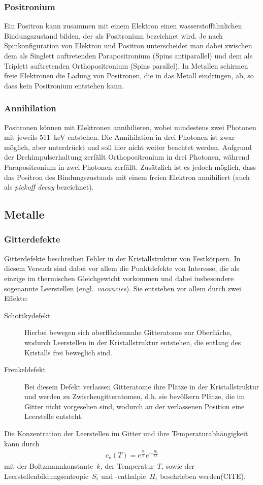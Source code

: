 \documentclass[11pt, a4paper]{article}
\numberwithin{equation}{section}
\newcommand{\korr}[1]{{\color{red}(#1)}}
\begin{document}
\subsubsection{Positronium}

Ein Positron kann zusammen mit einem Elektron einen wasserstoffähnlichen Bindungszustand bilden, der als Positronium bezeichnet wird.
Je nach Spinkonfiguration von Elektron und Positron unterscheidet man dabei zwischen dem als Singlett auftretenden Parapositronium (Spins antiparallel) und dem als Triplett auftretenden Orthopositronium (Spins parallel).
In Metallen schirmen freie Elektronen die Ladung von Positronen, die in das Metall eindringen, ab, so dass kein Positronium entstehen kann.

\subsubsection{Annihilation}

Positronen können mit Elektronen annihilieren, wobei mindestens zwei Photonen mit jeweils \SI{511}{keV} entstehen.
Die Annihilation in drei Photonen ist zwar möglich, aber unterdrückt und soll hier nicht weiter beachtet werden.
Aufgrund der Drehimpulserhaltung zerfällt Orthopositronium in drei Photonen, während Parapositronium in zwei Photonen zerfällt.
Zusätzlich ist es jedoch möglich, dass das Positron des Bindungszustands mit einem freien Elektron annihiliert (auch als \textit{pickoff decay} bezeichnet). 

\subsection{Metalle}
\subsubsection{Gitterdefekte}
Gitterdefekte beschreiben Fehler in der Kristallstruktur von Festkörpern.
In diesem Versuch sind dabei vor allem die Punktdefekte von Interesse, die als einzige im thermischen Gleichgewicht vorkommen und dabei insbesondere sogenannte Leerstellen (engl.~\textit{vacancies}).
Sie entstehen vor allem durch zwei Effekte:
\begin{description}
	\item[Schottkydefekt] Hierbei bewegen sich oberflächennahe Gitteratome zur Oberfläche, wodurch Leerstellen in der Kristallstruktur entstehen, die entlang des Kristalls frei beweglich sind.
	\item[Frenkeldefekt] Bei diesem Defekt verlassen Gitteratome ihre Plätze in der Kristallstruktur und werden zu Zwischengitteratomen, d.h. sie bevölkern Plätze, die im Gitter nicht vorgesehen sind, wodurch an der verlassenen Position eine Leerstelle entsteht.
\end{description}
Die Konzentration der Leerstellen im Gitter und ihre Temperaturabhängigkeit kann durch
\begin{align}
c_\mathrm{v}(T) = e^{\frac{S_\mathrm{t}}{k}}e^{-\frac{H_\mathrm{t}}{k T}}
\end{align}
mit der Boltzmannkonstante~$k$, der Temperatur~$T$, sowie der Leerstellenbildungsentropie~$S_\mathrm{t}$ und -enthalpie~$H_\mathrm{t}$ beschrieben werden\korr{CITE}.
\end{document}
